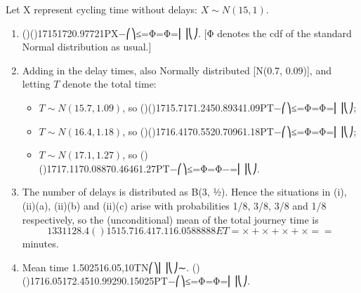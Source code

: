 \documentclass[a4paper,12pt]{article}
\begin{document}
Let X represent cycling time without delays: $X \sim N(15, 1)$.
\begin{enumerate}
\item ()()17151720.97721PX−⎛⎞≤=Φ=Φ=⎜⎟⎝⎠.
[Φ denotes the cdf of the standard Normal distribution as usual.]
\item  Adding in the delay times, also Normally distributed [N(0.7, 0.09)], and letting $T$ denote the total time:
\begin{itemize}
\item $T \sim N(15.7, 1.09)$, so ()()1715.7171.2450.89341.09PT−⎛⎞≤=Φ=Φ=⎜⎟⎝⎠;
\item $T \sim N(16.4, 1.18)$, so ()()1716.4170.5520.70961.18PT−⎛⎞≤=Φ=Φ=⎜⎟⎝⎠;
\item $T \sim N(17.1, 1.27)$, so ()()1717.1170.08870.46461.27PT−⎛⎞≤=Φ=Φ−=⎜⎟⎝⎠.
\end{itemize}
\item The number of delays is distributed as B(3, ½). Hence the situations in (i), (ii)(a), (ii)(b) and (ii)(c) arise with probabilities 1/8, 3/8, 3/8 and 1/8 respectively, so the (unconditional) mean of the total journey time is
\[1331128.4()1515.716.417.116.0588888ET=×+×+×+×==\] minutes.
\item Mean time 1.502516.05,10TN⎛⎞⎜⎟⎝⎠∼.
()()1716.05172.4510.99290.15025PT−⎛⎞≤=Φ=Φ=⎜⎟⎝⎠.
\end{enumerate}
\end{document}
